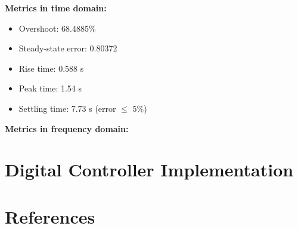 \documentclass[12pt, oneside]{article}
\begin{document}
\textbf{Metrics in time domain:}
\begin{itemize}
            \item Overshoot: 68.4885\%
            \item Steady-state error: 0.80372
            \item Rise time: 0.588 s
            \item Peak time: 1.54 s
            \item Settling time: 7.73 s (error $\leq$ 5\%)
        \end{itemize}
\textbf{Metrics in frequency domain:}

\pagebreak
\section{Digital Controller Implementation}
\section{References}
\end{document}
